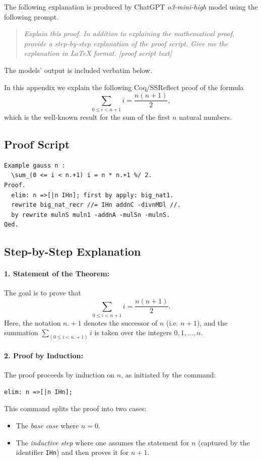 \documentclass[letterpaper]{article}
\begin{document}
The following explanation is produced by ChatGPT \textit{o3-mini-high}
model using the following prompt.

\begin{quotation}
  \textit{Explain this proof. In addition to explaining the
    mathematical proof, provide a step-by-step explanation of the
    proof script. Give me the explanation in LaTeX format. [proof script text]}

\end{quotation}

\noindent The models' output is included verbatim below.

\noindent\hdashrule[0.5ex]{\textwidth}{1pt}{1pt}

In this appendix we explain the following Coq/SSReflect proof of the formula
\[
\sum_{0 \le i < n+1} i = \frac{n(n+1)}{2},
\]
which is the well-known result for the sum of the first \( n \) natural numbers.

\subsection*{Proof Script}
\begin{lstlisting}
Example gauss n :
  \sum_(0 <= i < n.+1) i = n * n.+1 %/ 2.
Proof.
  elim: n =>[|n IHn]; first by apply: big_nat1.
  rewrite big_nat_recr //= IHn addnC -divnMDl //.
  by rewrite mulnS muln1 -addnA -mulSn -mulnS.
Qed.
\end{lstlisting}

\subsection*{Step-by-Step Explanation}

\paragraph{1. Statement of the Theorem:}
The goal is to prove that
\[
\sum_{0 \le i < n+1} i = \frac{n(n+1)}{2}.
\]
Here, the notation \( n.+1 \) denotes the successor of \( n \) (i.e. \( n+1 \)), and the summation \(\sum_(0 \le i < n.+1) i\) is taken over the integers \( 0, 1, \dots, n \).

\paragraph{2. Proof by Induction:} 
The proof proceeds by induction on \( n \), as initiated by the command:
\begin{verbatim}
elim: n =>[|n IHn];
\end{verbatim}
This command splits the proof into two cases:
\begin{itemize}
    \item The \emph{base case} where \( n = 0 \).
    \item The \emph{inductive step} where one assumes the statement for \( n \) (captured by the identifier \verb|IHn|) and then proves it for \( n+1 \).
\end{itemize}
\end{document}
